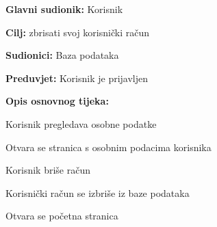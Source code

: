 					\noindent {}
					\begin{packed_item}
	
						\item \textbf{Glavni sudionik: }Korisnik
						\item  \textbf{Cilj:} zbrisati svoj korisnički račun
						\item  \textbf{Sudionici:} Baza podataka
						\item  \textbf{Preduvjet:} Korisnik je prijavljen
						\item  \textbf{Opis osnovnog tijeka:}
						
						\item[] \begin{packed_enum}
	
							\item  Korisnik pregledava osobne podatke
							\item Otvara se stranica s osobnim podacima korisnika
							\item Korisnik briše račun
							\item Korisnički račun se izbriše iz baze podataka
							\item Otvara se početna stranica
						\end{packed_enum}
					
					\end{packed_item}
					
					
                
